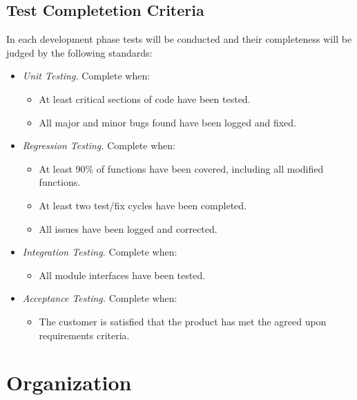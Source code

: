 \documentclass[a3paper, 11pt]{article}
\begin{document}
\subsection{Test Completetion Criteria}
In each development phase tests will be conducted and their completeness will be judged by the following standards:
\begin{itemize}
	\setlength\itemsep{-0.25em}
	\item \textit{Unit Testing.} Complete when:
	\begin{itemize}
		\item At least critical sections of code have been tested. 
		\item All major and minor bugs found have been logged and fixed. 
	\end{itemize}
	\item \textit{Regression Testing.} Complete when:
	\begin{itemize}
		\item At least 90\% of functions have been covered, including all modified functions. 
		\item At least two test/fix cycles have been completed. 
		\item All issues have been logged and corrected. 
	\end{itemize}
	\item \textit{Integration Testing.} Complete when:
	\begin{itemize}
		\item All module interfaces have been tested. 
	\end{itemize}
	\item \textit{Acceptance Testing.} Complete when:
	\begin{itemize}
		\item The customer is satisfied that the product has met the agreed upon requirements criteria. 
	\end{itemize}
\end{itemize}

\par


\section{Organization}
\end{document}
